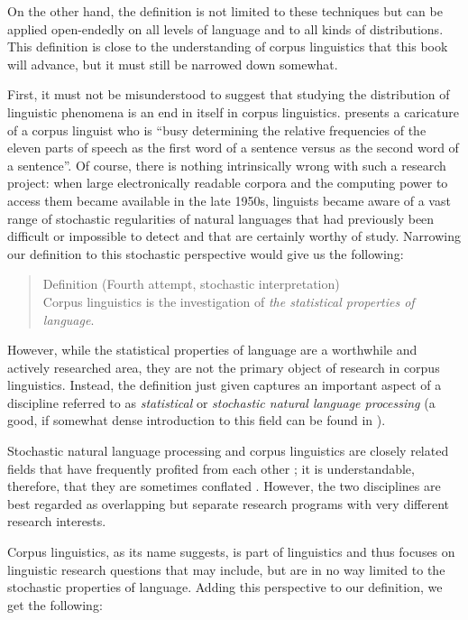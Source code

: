 On the other hand, the definition is not limited to these techniques but can be applied open-endedly on all levels of language and to all kinds of distributions. This definition is close to the understanding of corpus linguistics that this book will advance, but it must still be narrowed down somewhat.

First, it must not be misunderstood to suggest that studying the distribution of linguistic phenomena is an end in itself in corpus linguistics. \citet[35]{fillmore_corpus_1992} presents a caricature of a corpus linguist who is ``busy determining the relative frequencies of the eleven parts of speech as the first word of a sentence versus as the second word of a sentence''. Of course, there is nothing intrinsically wrong with such a research project: when large electronically readable corpora and the computing power to access them became available in the late 1950s, linguists became aware of a vast range of stochastic regularities of natural languages that had previously been difficult or impossible to detect and that are certainly worthy of study. Narrowing our definition to this stochastic perspective would give us the following:

\begin{quotation}
Definition (Fourth attempt, stochastic interpretation) \\
Corpus linguistics is the investigation of \textit{the statistical properties of language}.
\end{quotation}

However, while the statistical properties of language are a worthwhile and actively researched area, they are not the primary object of research in corpus linguistics. Instead, the definition just given captures an important aspect of a discipline referred to as \emph{statistical} or \emph{stochastic natural language processing} (a good, if somewhat dense introduction to this field can be found in \citet{manning_foundations_1999}).

Stochastic natural language processing and corpus linguistics are closely related fields that have frequently profited from each other \citep[see, e.g.,][5]{kennedy_introduction_1998}; it is understandable, therefore, that they are sometimes conflated \citep[see, e.g.,][769]{sebba_corpora_1994}. However, the two disciplines are best regarded as overlapping but separate research programs with very different research interests.

Corpus linguistics, as its name suggests, is part of linguistics and thus focuses on linguistic research questions that may include, but are in no way limited to the stochastic properties of language. Adding this perspective to our definition, we get the following: 

